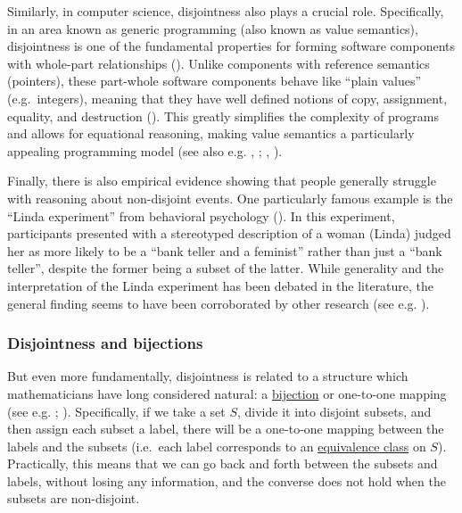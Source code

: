 \documentclass[
  openany]{book}
\theoremstyle{definition}
\theoremstyle{definition}
\theoremstyle{definition}
\theoremstyle{definition}
\theoremstyle{remark}
\begin{document}
Similarly, in computer science, disjointness also plays a crucial role. Specifically, in an area known as generic programming (also known as value semantics), disjointness is one of the fundamental properties for forming software components with whole-part relationships (). Unlike components with reference semantics (pointers), these part-whole software components behave like ``plain values'' (e.g.~integers), meaning that they have well defined notions of copy, assignment, equality, and destruction (). This greatly simplifies the complexity of programs and allows for equational reasoning, making value semantics a particularly appealing programming model (see also e.g. , ; , ).

Finally, there is also empirical evidence showing that people generally struggle with reasoning about non-disjoint events. One particularly famous example is the ``Linda experiment'' from behavioral psychology (). In this experiment, participants presented with a stereotyped description of a woman (Linda) judged her as more likely to be a ``bank teller and a feminist'' rather than just a ``bank teller'', despite the former being a subset of the latter. While generality and the interpretation of the Linda experiment has been debated in the literature, the general finding seems to have been corroborated by other research (see e.g. ).

\subsubsection{Disjointness and bijections}\label{disjointness-and-bijections}

But even more fundamentally, disjointness is related to a structure which mathematicians have long considered natural: a \hyperref[functions]{bijection} or one-to-one mapping (see e.g. ; ). Specifically, if we take a set \(S\), divide it into disjoint subsets, and then assign each subset a label, there will be a one-to-one mapping between the labels and the subsets (i.e.~each label corresponds to an \hyperref[partitions]{equivalence class} on \(S\)). Practically, this means that we can go back and forth between the subsets and labels, without losing any information, and the converse does not hold when the subsets are non-disjoint.
\end{document}
